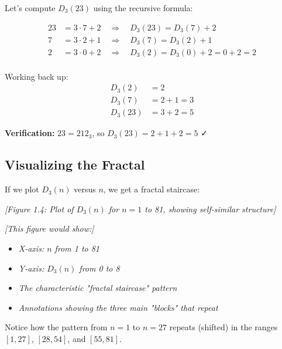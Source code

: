 \begin{example}
Let's compute $D_3(23)$ using the recursive formula:

\begin{align}
23 &= 3 \cdot 7 + 2 \quad \Rightarrow \quad D_3(23) = D_3(7) + 2 \\
7 &= 3 \cdot 2 + 1 \quad \Rightarrow \quad D_3(7) = D_3(2) + 1 \\
2 &= 3 \cdot 0 + 2 \quad \Rightarrow \quad D_3(2) = D_3(0) + 2 = 0 + 2 = 2 \\
\end{align}

Working back up:
\begin{align}
D_3(2) &= 2 \\
D_3(7) &= 2 + 1 = 3 \\
D_3(23) &= 3 + 2 = 5
\end{align}

\textbf{Verification:} $23 = 212_3$, so $D_3(23) = 2 + 1 + 2 = 5$ ✓
\end{example}

\subsection{Visualizing the Fractal}
\label{subsec:visualizing-fractal}


If we plot $D_3(n)$ versus $n$, we get a fractal staircase:

\begin{center}
\textit{[Figure 1.4: Plot of $D_3(n)$ for $n = 1$ to 81, showing self-similar structure]}

\textit{[This figure would show:]}
\begin{itemize}
\item \textit{X-axis: $n$ from 1 to 81}
\item \textit{Y-axis: $D_3(n)$ from 0 to 8}
\item \textit{The characteristic "fractal staircase" pattern}
\item \textit{Annotations showing the three main "blocks" that repeat}
\end{itemize}
\end{center}

Notice how the pattern from $n=1$ to $n=27$ repeats (shifted) in the ranges $[1,27]$, $[28,54]$, and $[55,81]$.

